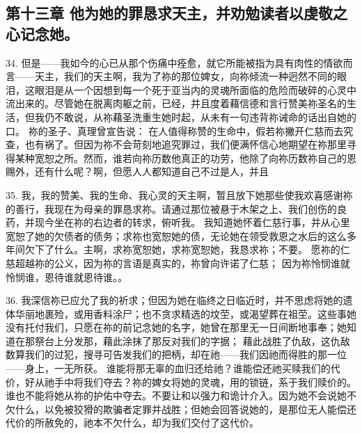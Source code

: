 
\subsection{第十三章 他为她的罪恳求天主，并劝勉读者以虔敬之心记念她。}

34. 但是——我如今的心已从那个伤痛中痊愈，就它所能被指为具有肉性的情欲而言——天主，我们的天主啊，我为了祢的那位婢女，向祢倾流一种迥然不同的眼泪，这眼泪是从一个因想到每一个死于亚当内的灵魂所面临的危险而破碎的心灵中流出来的。尽管她在脱离肉躯之前，已经，并且度着藉信德和言行赞美祢圣名的生活，但我仍不敢说，从祢藉圣洗重生她时起，从未有一句违背祢诫命的话出自她的口。 祢的圣子、真理曾宣告说： 在人值得称赞的生命中，假若祢撇开仁慈而去究查，也有祸了。但因为祢不会苛刻地追究罪过，我们便满怀信心地期望在祢那里寻得某种宽恕之所。然而，谁若向祢历数他真正的功劳，他除了向祢历数祢自己的恩赐外，还有什么呢？啊，但愿人人都知道自己不过是人，并且\par

35. 我，我的赞美、我的生命、我心灵的天主啊，暂且放下她那些使我欢喜感谢祢的善行，我现在为母亲的罪恳求祢。请通过那位被悬于木架之上、我们创伤的良药，并现今坐在祢的右边者的转求，俯听我。 我知道她怀着仁慈行事，并从心里宽恕了她的欠债者的债务；求祢也宽恕她的债，无论她在领受救恩之水后的这么多年间欠下了什么。主啊，求祢宽恕她，求祢宽恕她，我恳求祢；不要。 愿祢的仁慈超越祢的公义，因为祢的言语是真实的，祢曾向许诺了仁慈； 因为祢怜悯谁就怜悯谁，恩待谁就恩待谁。。\par

36. 我深信祢已应允了我的祈求；但因为她在临终之日临近时，并不思虑将她的遗体华丽地裹殓，或用香料涂尸；也不贪求精选的坟茔，或渴望葬在祖茔。这些事她没有托付我们，只愿在祢的前记念她的名字，她曾在那里无一日间断地事奉；她知道在那祭台上分发那，藉此涂抹了那反对我们的字据； 藉此战胜了仇敌，这仇敌数算我们的过犯，搜寻可告发我们的把柄，却在祂——我们因祂而得胜的那一位——身上，一无所获。 谁能将那无辜的血归还给祂？谁能偿还祂买赎我们的代价，好从祂手中将我们夺去？祢的婢女将她的灵魂，用的锁链，系于我们赎价的。谁也不能将她从祢的护佑中夺去。不要让和以强力和诡计介入。因为她不会说她不欠什么，以免被狡猾的欺骗者定罪并战胜；但她会回答说她的，是那位无人能偿还代价的所赦免的，祂本不欠什么，却为我们交付了这代价。\par

